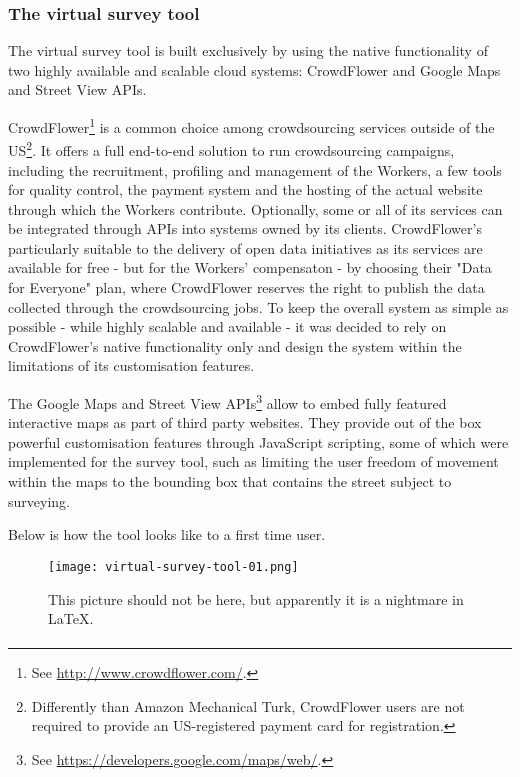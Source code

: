 \subsubsection{The virtual survey tool}

The virtual survey tool is built exclusively by using the native functionality of two highly available and scalable cloud systems: CrowdFlower and Google Maps and Street View APIs. 

CrowdFlower\footnote{See \url{http://www.crowdflower.com/}.} is a common choice among crowdsourcing services outside of the US\footnote{Differently than Amazon Mechanical Turk, CrowdFlower users are not required to provide an US-registered payment card for registration.}. It offers a full end-to-end solution to run crowdsourcing campaigns, including the recruitment, profiling and management of the Workers, a few tools for quality control, the payment system and the hosting of the actual website through which the Workers contribute. Optionally, some or all of its services can be integrated through APIs into systems owned by its clients. CrowdFlower's particularly suitable to the delivery of open data initiatives as its services are available for free - but for the Workers' compensaton - by choosing their "Data for Everyone" plan, where CrowdFlower reserves the right to publish the data collected through the crowdsourcing jobs. To keep the overall system as simple as possible - while highly scalable and available - it was decided to rely on CrowdFlower's native functionality only and design the system within the limitations of its customisation features.

The Google Maps and Street View APIs\footnote{See \url{https://developers.google.com/maps/web/}.} allow to embed fully featured interactive maps as part of third party websites. They provide out of the box powerful customisation features through JavaScript scripting, some of which were implemented for the survey tool, such as limiting the user freedom of movement within the maps to the bounding box that contains the street subject to surveying.   

Below is how the tool looks like to a first time user.

\begin{figure*}
	\texttt{[image: virtual-survey-tool-01.png]}
	\caption{This picture should not be here, but apparently it is a nightmare in LaTeX.}
	\label{fig:some_figure}
\end{figure*}

\paragraph{}

